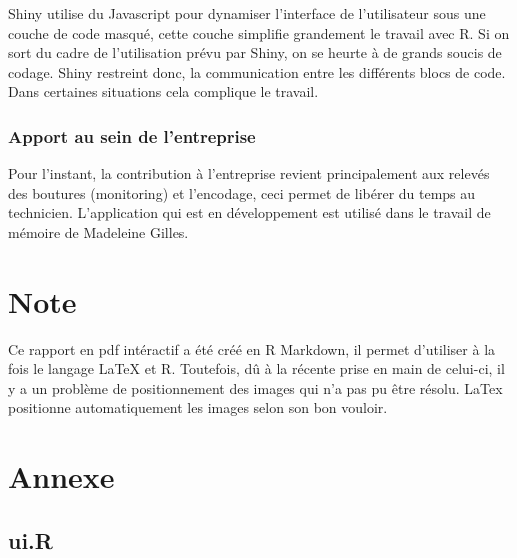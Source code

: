 \documentclass[]{report}
\begin{document}
Shiny utilise du Javascript pour dynamiser l'interface de l'utilisateur
sous une couche de code masqué, cette couche simplifie grandement le
travail avec R. Si on sort du cadre de l'utilisation prévu par Shiny, on
se heurte à de grands soucis de codage. Shiny restreint donc, la
communication entre les différents blocs de code. Dans certaines
situations cela complique le travail.

\subsection{Apport au sein de
l'entreprise}\label{apport-au-sein-de-lentreprise}

Pour l'instant, la contribution à l'entreprise revient principalement
aux relevés des boutures (monitoring) et l'encodage, ceci permet de
libérer du temps au technicien. L'application qui est en développement
est utilisé dans le travail de mémoire de Madeleine Gilles.

\chapter{Note}\label{note}

Ce rapport en pdf intéractif a été créé en R Markdown, il permet
d'utiliser à la fois le langage LaTeX et R. Toutefois, dû à la récente
prise en main de celui-ci, il y a un problème de positionnement des
images qui n'a pas pu être résolu. LaTex positionne automatiquement les
images selon son bon vouloir.

\chapter{Annexe}\label{annexe}

\section{ui.R}\label{ui.r}
\end{document}
